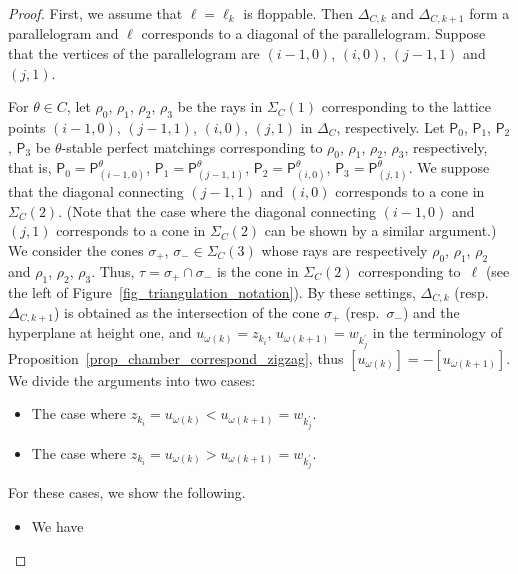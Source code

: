 \documentclass[10pt,a4paper]{amsart}
\numberwithin{equation}{section}
\theoremstyle{definition}
\newcommand{\sfP}{\mathsf{P}}
\newcommand{\permII}{\omega}
\begin{document}
\begin{proof}
First, we assume that $\ell=\ell_k$ is floppable.
Then $\Delta_{C,k}$ and $\Delta_{C,k+1}$ form a parallelogram and $\ell$ corresponds to a diagonal of the parallelogram.
Suppose that the vertices of the parallelogram are $(i-1,0)$, $(i,0)$, $(j-1,1)$ and $(j,1)$.

For $\theta\in C$, let $\rho_0$, $\rho_1$, $\rho_2$, $\rho_3$ be the rays in $\Sigma_C(1)$ corresponding to the lattice points
$(i-1,0)$, $(j-1,1)$, $(i,0)$, $(j,1)$ in $\Delta_C$, respectively.
Let $\sfP_0$, $\sfP_1$, $\sfP_2$, $\sfP_3$ be $\theta$-stable perfect matchings corresponding to $\rho_0$, $\rho_1$, $\rho_2$, $\rho_3$, respectively,
that is,
$
\sfP_0=\sfP_{(i-1,0)}^\theta$, $\sfP_1=\sfP_{(j-1,1)}^\theta$, $\sfP_2=\sfP_{(i,0)}^\theta$, $\sfP_3=\sfP_{(j,1)}^\theta$.
We suppose that the diagonal connecting $(j-1,1)$ and $(i,0)$ corresponds to a cone in $\Sigma_C(2)$.
(Note that the case where the diagonal connecting $(i-1,0)$ and $(j,1)$ corresponds to a cone in $\Sigma_C(2)$ can be shown by a similar argument.)
We consider the cones $\sigma_+$, $\sigma_-\in\Sigma_C(3)$ whose rays are respectively $\rho_0$, $\rho_1$, $\rho_2$ and $\rho_1$, $\rho_2$, $\rho_3$.
Thus, $\tau=\sigma_+\cap\sigma_-$ is the cone in $\Sigma_C(2)$ corresponding to~$\ell$ (see the left of Figure~\ref{fig_triangulation_notation}).
By these settings, $\Delta_{C,k}$ (resp.\ $\Delta_{C,k+1}$) is obtained as the intersection of the cone $\sigma_+$ (resp.\ $\sigma_-$) and the hyperplane at height one,
and $u_{\permII(k)}=z_{k_i}$, $u_{\permII(k+1)}=w_{k_j^\prime}$ in the terminology of Proposition~\ref{prop_chamber_correspond_zigzag},
thus $[u_{\permII(k)}]= -[u_{\permII(k+1)}]$. We divide the arguments into two cases:
\begin{itemize}\itemsep=0pt \setlength{\leftskip}{1cm}
\item[(Case 1)] The case where $z_{k_i}=u_{\permII(k)}<u_{\permII(k+1)}=w_{k_j^\prime}$.
\item[(Case 2)] The case where $z_{k_i}=u_{\permII(k)}>u_{\permII(k+1)}=w_{k_j^\prime}$.
\end{itemize}
For these cases, we show the following.
\begin{itemize}\itemsep=0pt \setlength{\leftskip}{1cm}\samepage
\item[(Case 1)] We have
\begin{equation}
\label{eq_degree_linebdl_main}

\end{equation}
\end{itemize}
\end{proof}
\end{document}
